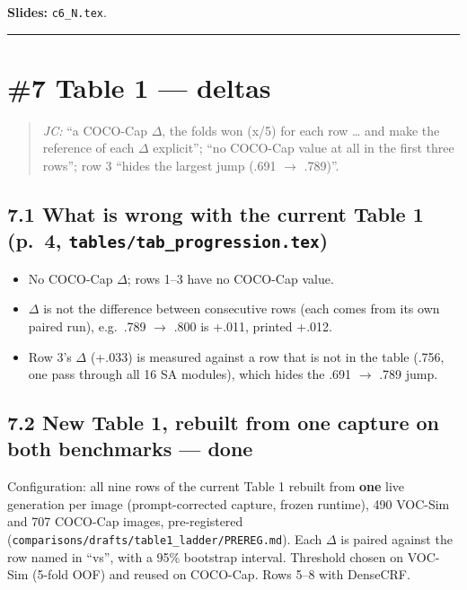 \documentclass[
  10pt,
]{article}
\providecommand{\tightlist}{%
  \setlength{\itemsep}{0pt}\setlength{\parskip}{0pt}}
\begin{document}
\textbf{Slides:} \texttt{c6\_N.tex}.

\begin{center}\rule{0.5\linewidth}{0.5pt}\end{center}

\section{\#7 Table 1 --- deltas}

\begin{quote}
\emph{JC:} ``a COCO-Cap \ensuremath{\Delta}, the folds won (x/5) for each row \ldots{} and
make the reference of each \ensuremath{\Delta} explicit''; ``no COCO-Cap value at all in
the first three rows''; row 3 ``hides the largest jump (.691 \ensuremath{\rightarrow} .789)''.
\end{quote}

\subsection{\texorpdfstring{7.1 What is wrong with the current Table 1
(p.~4,
\texttt{tables/tab\_progression.tex})}{7.1 What is wrong with the current Table 1 (p.~4, tables/tab\_progression.tex)}}

\begin{itemize}
\tightlist
\item
  No COCO-Cap \ensuremath{\Delta}; rows 1--3 have no COCO-Cap value.
\item
  \ensuremath{\Delta} is not the difference between consecutive rows (each comes from its
  own paired run), e.g.~.789 \ensuremath{\rightarrow} .800 is +.011, printed +.012.
\item
  Row 3's \ensuremath{\Delta} (+.033) is measured against a row that is not in the table
  (.756, one pass through all 16 SA modules), which hides the .691 \ensuremath{\rightarrow}
  .789 jump.
\end{itemize}

\subsection{7.2 New Table 1, rebuilt from one capture on both benchmarks
--- done}

Configuration: all nine rows of the current Table 1 rebuilt from
\textbf{one} live generation per image (prompt-corrected capture, frozen
runtime), 490 VOC-Sim and 707 COCO-Cap images, pre-registered
(\texttt{comparisons/drafts/table1\_ladder/PREREG.md}). Each \ensuremath{\Delta} is paired
against the row named in ``vs'', with a 95\% bootstrap interval.
Threshold chosen on VOC-Sim (5-fold OOF) and reused on COCO-Cap. Rows
5--8 with DenseCRF.
\end{document}
